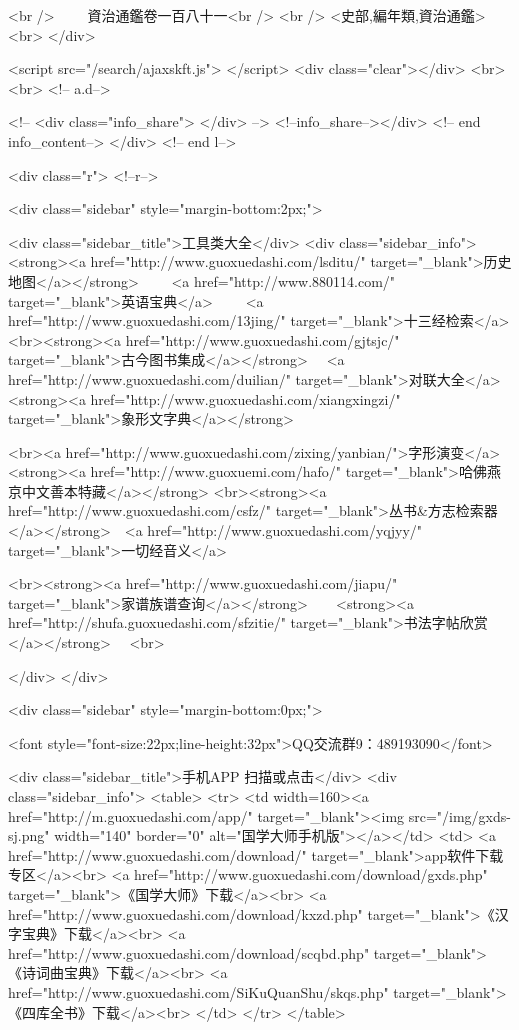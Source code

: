 <br />
　　資治通鑑卷一百八十一<br />
<br />
<史部,編年類,資治通鑑>  <br>
   </div> 

<script src="/search/ajaxskft.js"> </script>
 <div class="clear"></div>
<br>
<br>
 <!-- a.d-->

 <!--
<div class="info_share">
</div> 
-->
 <!--info_share--></div>   <!-- end info_content-->
  </div> <!-- end l-->

<div class="r">   <!--r-->



<div class="sidebar"  style="margin-bottom:2px;">

 
<div class="sidebar_title">工具类大全</div>
<div class="sidebar_info">
<strong><a href="http://www.guoxuedashi.com/lsditu/" target="_blank">历史地图</a></strong>　　
<a href="http://www.880114.com/" target="_blank">英语宝典</a>　　
<a href="http://www.guoxuedashi.com/13jing/" target="_blank">十三经检索</a>　
<br><strong><a href="http://www.guoxuedashi.com/gjtsjc/" target="_blank">古今图书集成</a></strong>　
<a href="http://www.guoxuedashi.com/duilian/" target="_blank">对联大全</a>　<strong><a href="http://www.guoxuedashi.com/xiangxingzi/" target="_blank">象形文字典</a></strong>　

<br><a href="http://www.guoxuedashi.com/zixing/yanbian/">字形演变</a>　　<strong><a href="http://www.guoxuemi.com/hafo/" target="_blank">哈佛燕京中文善本特藏</a></strong>
<br><strong><a href="http://www.guoxuedashi.com/csfz/" target="_blank">丛书&方志检索器</a></strong>　<a href="http://www.guoxuedashi.com/yqjyy/" target="_blank">一切经音义</a>　　

<br><strong><a href="http://www.guoxuedashi.com/jiapu/" target="_blank">家谱族谱查询</a></strong>　　<strong><a href="http://shufa.guoxuedashi.com/sfzitie/" target="_blank">书法字帖欣赏</a></strong>　
<br>

</div>
</div>


<div class="sidebar" style="margin-bottom:0px;">

<font style="font-size:22px;line-height:32px">QQ交流群9：489193090</font>


<div class="sidebar_title">手机APP 扫描或点击</div>
<div class="sidebar_info">
<table>
<tr>
	<td width=160><a href="http://m.guoxuedashi.com/app/" target="_blank"><img src="/img/gxds-sj.png" width="140"  border="0" alt="国学大师手机版"></a></td>
	<td>
<a href="http://www.guoxuedashi.com/download/" target="_blank">app软件下载专区</a><br>
<a href="http://www.guoxuedashi.com/download/gxds.php" target="_blank">《国学大师》下载</a><br>
<a href="http://www.guoxuedashi.com/download/kxzd.php" target="_blank">《汉字宝典》下载</a><br>
<a href="http://www.guoxuedashi.com/download/scqbd.php" target="_blank">《诗词曲宝典》下载</a><br>
<a href="http://www.guoxuedashi.com/SiKuQuanShu/skqs.php" target="_blank">《四库全书》下载</a><br>
</td>
</tr>
</table>

